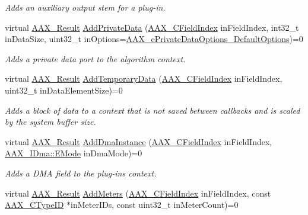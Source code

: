 \begin{DoxyCompactItemize}
\begin{DoxyCompactList}\small\item\em Adds an auxiliary output stem for a plug-\/in. \end{DoxyCompactList}\item 
virtual \hyperlink{a00149_a4d8f69a697df7f70c3a8e9b8ee130d2f}{A\+A\+X\+\_\+\+Result} \hyperlink{a00088_a125949841a13e97ff93fa321f2050433}{Add\+Private\+Data} (\hyperlink{a00149_ae807f8986143820cfb5d6da32165c9c7}{A\+A\+X\+\_\+\+C\+Field\+Index} in\+Field\+Index, int32\+\_\+t in\+Data\+Size, uint32\+\_\+t in\+Options=\hyperlink{a00206_a9f1ef2cb64daf30eaf145dfbb8cd0d00a59458e9bf18919c51e59eb2fd6e84a9a}{A\+A\+X\+\_\+e\+Private\+Data\+Options\+\_\+\+Default\+Options})=0
\begin{DoxyCompactList}\small\item\em Adds a private data port to the algorithm context. \end{DoxyCompactList}\item 
virtual \hyperlink{a00149_a4d8f69a697df7f70c3a8e9b8ee130d2f}{A\+A\+X\+\_\+\+Result} \hyperlink{a00088_ad8daad601b60fdbd6134fe0c8faa2fc4}{Add\+Temporary\+Data} (\hyperlink{a00149_ae807f8986143820cfb5d6da32165c9c7}{A\+A\+X\+\_\+\+C\+Field\+Index} in\+Field\+Index, uint32\+\_\+t in\+Data\+Element\+Size)=0
\begin{DoxyCompactList}\small\item\em Adds a block of data to a context that is not saved between callbacks and is scaled by the system buffer size. \end{DoxyCompactList}\item 
virtual \hyperlink{a00149_a4d8f69a697df7f70c3a8e9b8ee130d2f}{A\+A\+X\+\_\+\+Result} \hyperlink{a00088_aff9e1c726bbdf500f2d61b164589744e}{Add\+Dma\+Instance} (\hyperlink{a00149_ae807f8986143820cfb5d6da32165c9c7}{A\+A\+X\+\_\+\+C\+Field\+Index} in\+Field\+Index, \hyperlink{a00095_af8d0f19f2896dd6dbd126b919b24e39b}{A\+A\+X\+\_\+\+I\+Dma\+::\+E\+Mode} in\+Dma\+Mode)=0
\begin{DoxyCompactList}\small\item\em Adds a D\+M\+A field to the plug-\/in\textquotesingle{}s context. \end{DoxyCompactList}\item 
virtual \hyperlink{a00149_a4d8f69a697df7f70c3a8e9b8ee130d2f}{A\+A\+X\+\_\+\+Result} \hyperlink{a00088_a5e4a61afa3d6510891e16d7179bdaa64}{Add\+Meters} (\hyperlink{a00149_ae807f8986143820cfb5d6da32165c9c7}{A\+A\+X\+\_\+\+C\+Field\+Index} in\+Field\+Index, const \hyperlink{a00149_ac678f9c1fbcc26315d209f71a147a175}{A\+A\+X\+\_\+\+C\+Type\+I\+D} $\ast$in\+Meter\+I\+Ds, const uint32\+\_\+t in\+Meter\+Count)=0

\end{DoxyCompactItemize}
